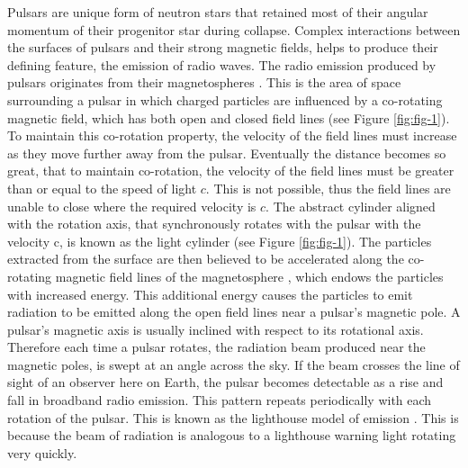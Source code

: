 Pulsars are unique form of neutron stars that retained most of their angular momentum of their progenitor star during collapse. Complex interactions between the surfaces of pulsars and their strong magnetic fields, helps to produce their defining feature, the emission of radio waves. The radio emission produced by pulsars originates from their magnetospheres \citep{ghosh}. This is the area of space surrounding a pulsar in which charged particles are influenced by a co-rotating magnetic field, which has both open and closed field lines \citep{lorimer} (see Figure \ref{fig:fig-1}). To maintain this co-rotation property, the velocity of the field lines must increase as they move further away from the pulsar. Eventually the distance becomes so great, that to maintain co-rotation, the velocity of the field lines must be greater than or equal to the speed of light $c$. This is not possible, thus the field lines are unable to close where the required velocity is $c$. The abstract cylinder aligned with the rotation axis, that synchronously rotates with the pulsar with the velocity c, is known as the light cylinder (see Figure \ref{fig:fig-1}). The particles extracted from the surface are then believed to be accelerated along the co-rotating magnetic field lines of the magnetosphere \citep{lorimer2008}, which endows the particles with increased energy. This additional energy causes the particles to emit radiation \citep{lorimer2008} to be emitted along the open field lines near a pulsar's magnetic pole. A pulsar's magnetic axis is usually inclined with respect to its rotational axis. Therefore each time a pulsar rotates, the radiation beam produced near the magnetic poles, is swept at an angle across the sky. If the beam crosses the line of sight of an observer here on Earth, the pulsar becomes detectable as a rise and fall in broadband radio emission. This pattern repeats periodically with each rotation of the pulsar. This is known as the lighthouse model of emission \citep{lorimer2008}. This is because the beam of radiation is analogous to a lighthouse warning light rotating very quickly.
